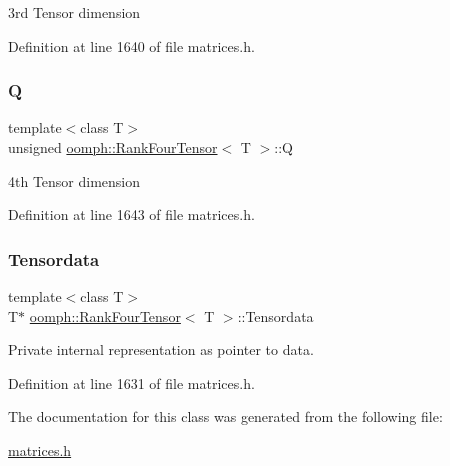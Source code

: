 3rd Tensor dimension 



Definition at line 1640 of file matrices.\+h.

\mbox{\label{classoomph_1_1RankFourTensor_ae62059ee0897816d899c266ad6c03c8b}} 
\subsubsection{\texorpdfstring{Q}{Q}}
{\footnotesize\ttfamily template$<$class T$>$ \\
unsigned \hyperlink{classoomph_1_1RankFourTensor}{oomph\+::\+Rank\+Four\+Tensor}$<$ T $>$\+::Q\hspace{0.3cm}{\ttfamily [private]}}



4th Tensor dimension 



Definition at line 1643 of file matrices.\+h.

\mbox{\label{classoomph_1_1RankFourTensor_a4e195572c01989507a4be4cfdcd26210}} 
\subsubsection{\texorpdfstring{Tensordata}{Tensordata}}
{\footnotesize\ttfamily template$<$class T$>$ \\
T$\ast$ \hyperlink{classoomph_1_1RankFourTensor}{oomph\+::\+Rank\+Four\+Tensor}$<$ T $>$\+::Tensordata\hspace{0.3cm}{\ttfamily [private]}}



Private internal representation as pointer to data. 



Definition at line 1631 of file matrices.\+h.



The documentation for this class was generated from the following file\+:\begin{DoxyCompactItemize}
\item 
\hyperlink{matrices_8h}{matrices.\+h}\end{DoxyCompactItemize}
